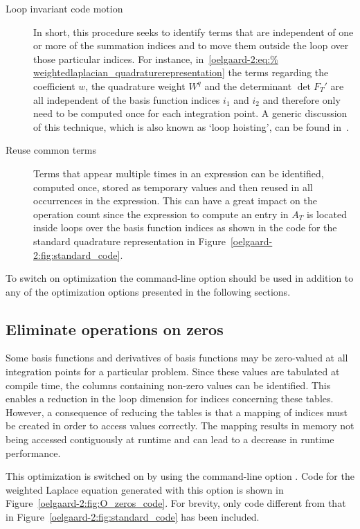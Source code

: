 \begin{description}
\item[Loop invariant code motion] In short, this procedure seeks to
identify terms that are independent of one or more of the summation
indices and to move them outside the loop over those particular
indices.  For instance, in~\eqref{oelgaard-2:eq:%
weightedlaplacian_quadraturerepresentation} the terms regarding the
coefficient $w$, the quadrature weight $W^q$ and the determinant $\det
F_T'$ are all independent of the basis function indices $i_1$ and
$i_2$ and therefore only need to be computed once for each integration
point.  A generic discussion of this technique, which is also known as
`loop hoisting', can be found in~\citet{AhoSethiUllman1986}.

\item[Reuse common terms] Terms that appear multiple times in an
  expression can be identified, computed once, stored as temporary
  values and then reused in all occurrences in the expression.  This can
  have a great impact on the operation count since the expression to
  compute an entry in $A_T$ is located inside loops over the basis
  function indices as shown in the code for the standard quadrature
  representation in Figure~\ref{oelgaard-2:fig:standard_code}.
\end{description}

To switch on optimization the command-line option  should be
used in addition to any of the \ffc{} optimization options presented
in the following sections.

\subsection{Eliminate operations on zeros}
\label{oelgaard-2:sec:eliminate_zeros}

Some basis functions and derivatives of basis functions may be
zero-valued at all integration points for a particular problem.  Since
these values are tabulated at compile time, the columns containing
non-zero values can be identified.  This enables a reduction in the
loop dimension for indices concerning these tables.  However, a
consequence of reducing the tables is that a mapping of indices must
be created in order to access values correctly.  The mapping results
in memory not being accessed contiguously at runtime and can lead to a
decrease in runtime performance.

This optimization is switched on by using the command-line option
. Code for the weighted Laplace equation
generated with this option is shown in
Figure~\ref{oelgaard-2:fig:O_zeros_code}. For brevity, only code
different from that in Figure~\ref{oelgaard-2:fig:standard_code} has
been included.

